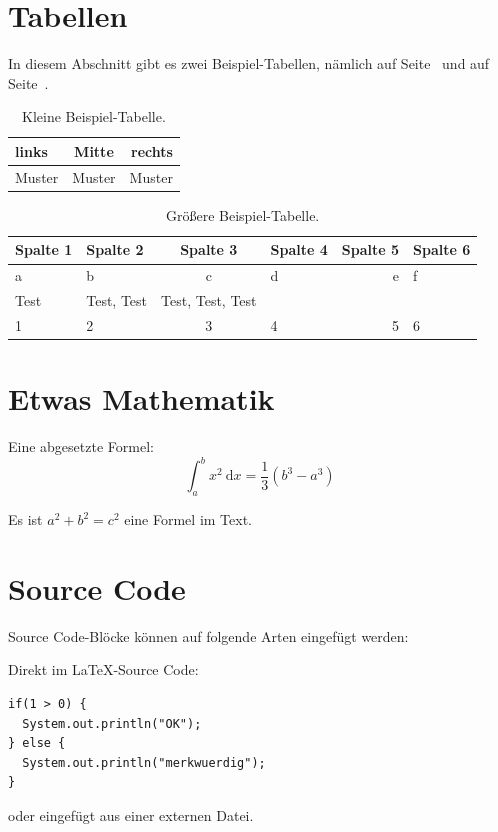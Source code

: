 \section{Tabellen}

In diesem Abschnitt gibt es zwei Beispiel-Tabellen, nämlich auf Seite~\pageref{tab:BeispielTabelleKlein} und auf Seite~\pageref{tab:BeispielTabelleGroesser}.

\begin{table}[htb]
\centering
\begin{tabular}{lcr}
links & Mitte & rechts \\
\hline
Muster & Muster & Muster \\
\end{tabular}
\caption{Kleine Beispiel-Tabelle.}
\label{tab:BeispielTabelleKlein}
\end{table}

\begin{table}[htb]
\centering
\begin{tabular}{|l|l|c|l|r||l}
    \textbf{Spalte 1} & \textbf{Spalte 2} & \textbf{Spalte 3} & \textbf{Spalte 4} & \textbf{Spalte 5} & \textbf{Spalte 6} \\
    \hline
    a        & b          & c                & d        & e        & f        \\
    Test     & Test, Test & Test, Test, Test & ~        & ~        & ~        \\
    1        & 2          & 3                & 4        & 5        & 6        \\
\end{tabular}
\caption{Größere Beispiel-Tabelle.}
\label{tab:BeispielTabelleGroesser}
\end{table}

\section{Etwas Mathematik}

Eine abgesetzte Formel:
\[
  \int_a^b x^2 \: \mathrm{d} x = \frac{1}{3} (b^3 - a^3)
\]

Es ist $a^2+b^2 = c^2$ eine Formel im Text.

\section{Source Code}

Source Code-Blöcke können auf folgende Arten eingefügt werden:

\lstset{language=Java}

Direkt im \LaTeX-Source Code:
\begin{lstlisting}
if(1 > 0) {
  System.out.println("OK"); 
} else {
  System.out.println("merkwuerdig");
}
\end{lstlisting}

oder eingefügt aus einer externen Datei.

